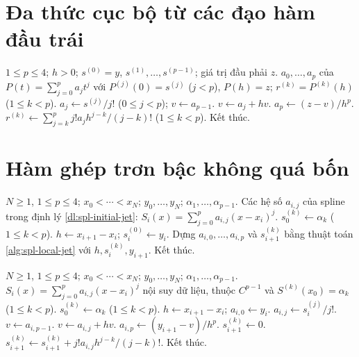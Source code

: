 \documentclass[12pt,a4paper,oneside]{book}
\numberwithin{algorithm}{chapter}
\theoremstyle{definition}
\begin{document}
\section{Đa thức cục bộ từ các đạo hàm đầu trái}
\begin{algorithm}[H]
\caption{Dựng một đoạn và truyền các đạo hàm}
\label{alg:spl-local-jet}
\begin{algorithmic}[1]
\Require $1\leq p\leq4$; $h>0$; $s^{(0)}=y$, $s^{(1)},\ldots,s^{(p-1)}$; giá trị đầu phải $z$.
\Ensure $a_0,\ldots,a_p$ của $P(t)=\sum_{j=0}^pa_jt^j$ với $P^{(j)}(0)=s^{(j)}$ ($j<p$), $P(h)=z$; $r^{(k)}=P^{(k)}(h)$ ($1\leq k<p$).
\State $a_j\gets s^{(j)}/j!$ ($0\leq j<p$); $v\gets a_{p-1}$.
 \State $v\gets a_j+hv$.
\EndFor
\Statex
\State $a_p\gets(z-v)/h^p$.
\State $r^{(k)}\gets\sum_{j=k}^p j!a_jh^{j-k}/(j-k)!$ ($1\leq k<p$).
\State Kết thúc.
\end{algorithmic}
\end{algorithm}

\section{Hàm ghép trơn bậc không quá bốn}
\begin{algorithm}[H]
\caption{Dựng spline từ đạo hàm đầu trái: sơ lược}
\label{alg:spl-initial-jet-short}
\begin{algorithmic}[1]
\Require $N\geq1$, $1\leq p\leq4$; $x_0<\cdots<x_N$; $y_0,\ldots,y_N$; $\alpha_1,\ldots,\alpha_{p-1}$.
\Ensure Các hệ số $a_{i,j}$ của spline trong định lý \ref{dl:spl-initial-jet}: $S_i(x)=\sum_{j=0}^pa_{i,j}(x-x_i)^j$.
\State $s_0^{(k)}\gets\alpha_k$ ($1\leq k<p$).
 \State $h\gets x_{i+1}-x_i$; $s_i^{(0)}\gets y_i$.
 \State Dựng $a_{i,0},\ldots,a_{i,p}$ và $s_{i+1}^{(k)}$ bằng thuật toán \ref{alg:spl-local-jet} với $h,s_i^{(k)},y_{i+1}$.
\EndFor
\Statex
\State Kết thúc.
\end{algorithmic}
\end{algorithm}
\begin{algorithm}[H]
\caption{Dựng spline từ đạo hàm đầu trái: chi tiết}
\label{alg:spl-initial-jet}
\begin{algorithmic}[1]
\Require $N\geq1$, $1\leq p\leq4$; $x_0<\cdots<x_N$; $y_0,\ldots,y_N$; $\alpha_1,\ldots,\alpha_{p-1}$.
\Ensure $S_i(x)=\sum_{j=0}^pa_{i,j}(x-x_i)^j$ nội suy dữ liệu, thuộc $C^{p-1}$ và $S^{(k)}(x_0)=\alpha_k$ ($1\leq k<p$).
\State $s_0^{(k)}\gets\alpha_k$ ($1\leq k<p$).
 \State $h\gets x_{i+1}-x_i$; $a_{i,0}\gets y_i$.
  \State $a_{i,j}\gets s_i^{(j)}/j!$.
 \EndFor
 \Statex
 \State $v\gets a_{i,p-1}$.
  \State $v\gets a_{i,j}+hv$.
 \EndFor
 \Statex
 \State $a_{i,p}\gets(y_{i+1}-v)/h^p$.
  \State $s_{i+1}^{(k)}\gets0$.
   \State $s_{i+1}^{(k)}\gets s_{i+1}^{(k)}+j!a_{i,j}h^{j-k}/(j-k)!$.
  \EndFor
 \EndFor
\EndFor
\Statex
\State Kết thúc.
\end{algorithmic}
\end{algorithm}
\end{document}

